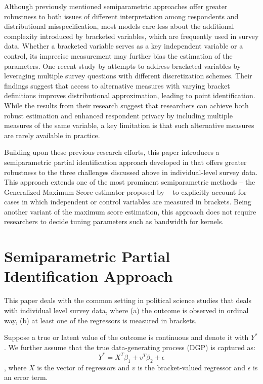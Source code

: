 \documentclass{article}
\begin{document}
Although previously mentioned semiparametric approaches offer greater robustness to both issues of different interpretation among respondents and distributional misspecification, most models care less about the additional complexity introduced by bracketed variables, which are frequently used in survey data. Whether a bracketed variable serves as a key independent variable or a control, its imprecise measurement may further bias the estimation of the parameters. One recent study by \citet{Chan2024a} attempts to address bracketed variables by leveraging multiple survey questions with different discretization schemes. Their findings suggest that access to alternative measures with varying bracket definitions improves distributional approximation, leading to point identification. While the results from their research suggest that researchers can achieve both robust estimation and enhanced respondent privacy by including multiple measures of the same variable, a key limitation is that such alternative measures are rarely available in practice.

Building upon these previous research efforts, this paper introduces a semiparametric partial identification approach developed in \citet{Wang2022a} that offers greater robustness to the three challenges discussed above in individual-level survey data. This approach extends one of the most prominent semiparametric methods -- the Generalized Maximum Score estimator proposed by \citet{Lee1992a} -- to explicitly account for cases in which independent or control variables are measured in brackets. Being another variant of the maximum score estimation, this approach does not require researchers to decide tuning parameters such as bandwidth for kernels.


\section{Semiparametric Partial Identification Approach}
This paper deals with the common setting in political science studies that deals with individual level survey data, where (a) the outcome is observed in ordinal way, (b) at least one of the regressors is measured in brackets. 

Suppose a true or latent value of the outcome is continuous and denote it with $Y^{\ast}$. We further assume that the true data-generating process (DGP) is captured as:
$$
    Y^{\ast} = X^{T}\beta_{1} + v^{T}\beta_{2} + \epsilon
$$ 
, where $X$ is the vector of regressors and $v$ is the bracket-valued regressor and $\epsilon$ is an error term. 
\end{document}
